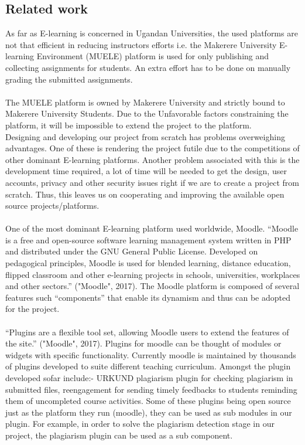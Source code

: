 \documentclass[11pt]{article}
\begin{document}
	\subsection{Related work}
		As far as E-learning is concerned in Ugandan Universities, the used platforms are not that efficient in reducing 				instructors efforts i.e. the Makerere University E-learning Environment (MUELE) platform is used for only publishing and 				collecting assignments for students. An extra effort has to be done on manually grading the submitted assignments.\\ \\
		The MUELE platform is owned by Makerere University and strictly bound to Makerere University Students.  Due to the 			Unfavorable factors constraining the platform, it will be impossible to extend the project to the platform.\\
		Designing and developing our project from scratch has problems overweighing advantages. One of these is rendering 			the project futile due to the competitions of other dominant E-learning platforms. Another problem associated with this is the 			development time required, a lot of time will be needed to get the design, user accounts, privacy and other security issues 			right if we are to create a project from scratch. Thus, this leaves us on cooperating and improving the available open source 			projects/platforms.\\ \\
		One of the most dominant E-learning platform used worldwide, Moodle. “Moodle is a free and open-source software 			learning management system written in PHP and distributed under the GNU General Public License. Developed on pedagogical 			principles, Moodle is used for blended learning, distance education, flipped classroom and other e-learning projects in schools, 			universities, workplaces and other sectors.” ("Moodle", 2017). The Moodle platform is composed of several features such 			“components” that enable its dynamism and thus can be adopted for the project. \\ \\
		“Plugins are a flexible tool set, allowing Moodle users to extend the features of the site.” ("Moodle", 2017). Plugins for 			moodle can be thought of modules or widgets with specific functionality. Currently moodle is maintained by  thousands of 			plugins developed to suite different teaching curriculum. Amongst the plugin developed sofar include:- URKUND plagiarism 			plugin for checking plagiarism in submitted files, reengagement for sending timely feedbacks to students reminding them of 			uncompleted course activities. Some of these plugins being open source just as the platform they run (moodle), they can be 			used as sub modules in our plugin. For example, in order to solve the plagiarism detection stage in our project, the plagiarism 			plugin can be used as a sub component. \\ \\
\end{document}
